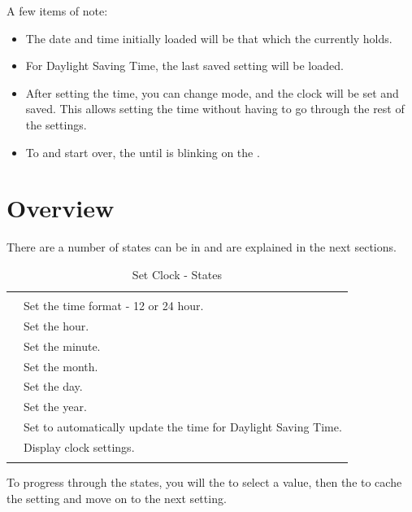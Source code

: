 \pagebreak
A few items of note:

\begin{itemize}
  \item The date and time initially loaded will be that which the 
    currently holds.
  \item For Daylight Saving Time, the last saved setting will be loaded.
  \item After setting the time, you can change mode, 
    and the clock will be set and saved.  This allows setting the time
    without having to go through the rest of the settings.
  \item To  and start over,  the  until \symD{<<<<} is
    blinking on the .
\end{itemize}

\section{Overview}

There are a number of states  can be in and are explained in the next
sections.

\begin{table}[H]
\centering
\begin{tabu} { X[1,c,m] | X[3,l,m] }
  \thrule
   &  \\ \mrule

   & Set the time format - \num{12} or \num{24} hour. \\ 
   & Set the hour. \\ 
   & Set the minute. \\ 
   & Set the month. \\ 
   & Set the day. \\ 
   & Set the year. \\ 
   & Set to automatically update the time for Daylight Saving Time. \\ 
   & Display clock settings. \\
  \bhrule
\end{tabu}
\caption{Set Clock - States}
\end{table}

To progress through the states, you will  the  to select a value,
then  the  to cache the setting and move on to the next setting.

